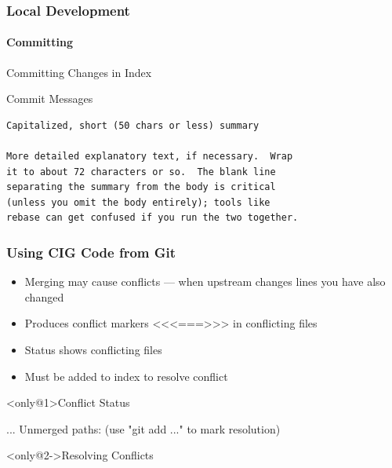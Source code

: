 \begin{frame}[fragile]
 \frametitle{Local Development}
 \framesubtitle{Committing}

 \begin{exampleblock}{Committing Changes in Index}
  \begin{semiverbatim}
\end{semiverbatim}
 \end{exampleblock}

 \begin{block}{Commit Messages}
\begin{verbatim}
Capitalized, short (50 chars or less) summary

More detailed explanatory text, if necessary.  Wrap
it to about 72 characters or so.  The blank line
separating the summary from the body is critical
(unless you omit the body entirely); tools like
rebase can get confused if you run the two together.
\end{verbatim}
 \end{block}
\end{frame}

\begin{frame}[fragile,t]
 \frametitle{Using CIG Code from Git}

 \begin{itemize}
  \item Merging may cause \alert{conflicts} --- when upstream changes lines you
        have also changed
  \item Produces conflict markers \alert{<{}<{}<===>{}>{}>} in conflicting files
  \item Status shows conflicting files
  \item Must be added to index to resolve conflict
 \end{itemize}

 \begin{exampleblock}<only@1>{Conflict Status}
  \begin{semiverbatim}
...
 Unmerged paths:
    (use "git add ..." to mark resolution)

\end{semiverbatim}
 \end{exampleblock}

 \begin{exampleblock}<only@2->{Resolving Conflicts}
  \begin{semiverbatim}

\end{semiverbatim}
 \end{exampleblock}
\end{frame}

